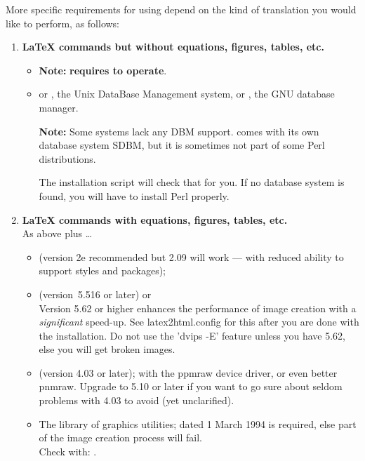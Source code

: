 \medskip\htmlrule
\medskip\noindent
More specific requirements for using \latextohtml{} 
depend on the kind of translation you would like to perform, as follows:
%
\begin{enumerate}
\item 
{}%
\textbf{\LaTeX{}  commands but without equations, figures, tables, etc.} \hfill
\begin{itemize}
\item 
{}
\begin{small}
\textbf{Note:} \latextohtml{}\textbf{ requires  to operate}.
\end{small}\html{\smallskip}


%
\item 
{} or , the Unix DataBase Management system,
or , the GNU database manager.

\textbf{Note: }Some systems lack any DBM support.
 comes with its own database system SDBM, but it is sometimes
not part of some Perl distributions.

The installation script  will check that for you.
If no database system is found, you will have to install Perl
properly.
\end{itemize}

%
%
%
\item 
\textbf{\LaTeX{}  commands with equations, figures, tables, etc.} \\
As above plus \dots
%
\begin{itemize}
\item {} (version 2e recommended but 2.09 will work --- with
reduced ability to support styles and packages);
%
\item 
{}
(version~5.516 or later) or \\
  Version 5.62 or higher enhances the performance of image creation
  with a \emph{significant} speed-up. See latex2html.config for this
  after you are done with the installation.
  Do not use the 'dvips -E' feature unless you have 5.62, else you
  will get broken images.
%
\item 
{}  (version 4.03 or later);
  with the ppmraw device driver, or even better pnmraw.
  Upgrade to 5.10 or later if you want to go sure about seldom problems
  with 4.03 to avoid (yet unclarified).
%
%
%
\item 
The 
library of graphics utilities;  dated 1 March 1994
is required, else part of the image creation process will fail.\\
Check with:  .


\end{itemize}
\end{enumerate}
